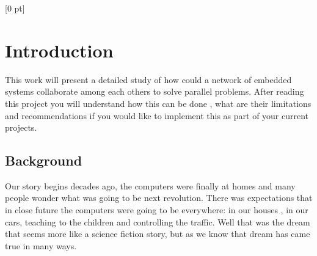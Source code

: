 
\titlespacing{\chapter}{0 pt}{30 pt}{50 pt}[0 pt]
\titleformat{\section}{\Large\bfseries}{\thesection}{0 pt}{\hspace{30 pt}}
\titleformat{\subsection}{\large\bfseries}{\thesubsection}{0 pt}{\hspace{30 pt}}
\pagestyle{fancy}
\fancyhead[LO,LE]{\footnotesize\textit{\leftmark}}
\fancyhead[RO,RE]{\thepage}
\fancyfoot[CO,CE]{}

\chapter{Introduction} %

\normalsize

This work will present a detailed study of how could a network of embedded
systems collaborate among each others to solve parallel problems. After reading
this project you will understand how this can be done , what are their
limitations and recommendations if you would like to implement this as part of 
your current projects. 

\section{Background}
\vspace{30 pt}
\noindent

Our story begins decades ago, the computers were finally at homes and many
people wonder what was going to be next revolution. There was expectations that
in close future the computers were going to be everywhere: in our houses , in
our cars, teaching to the children and controlling the traffic. Well that was
the dream that seems more like a science fiction story, but as we know that
dream has came true in many ways.


